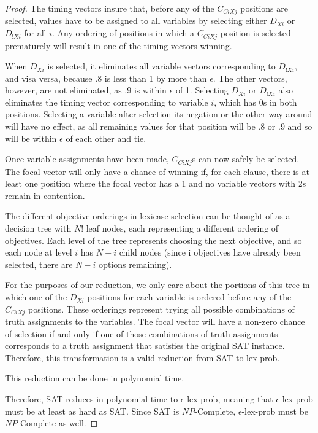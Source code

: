 \documentclass[sigconf]{acmart}
\begin{document}
\begin{proof}
The timing vectors insure that, before any of the $C_{CiXj}$ positions are selected, values have to be assigned to all variables by selecting either $D_{Xi}$ or $D_{!Xi}$ for all $i$. Any ordering of positions in which a $C_{CiXj}$ position is selected prematurely will result in one of the timing vectors winning.

When $D_{Xi}$ is selected, it eliminates all variable vectors corresponding to $D_{!Xi}$, and visa versa, because .8 is less than 1 by more than $\epsilon$. The other vectors, however, are not eliminated, as .9 is within $\epsilon$ of 1. Selecting $D_{Xi}$ or $D_{!Xi}$ also eliminates the timing vector corresponding to variable $i$, which has 0s in both positions. Selecting a variable after selection its negation or the other way around will have no effect, as all remaining values for that position will be .8 or .9 and so will be within $\epsilon$ of each other and tie.

Once variable assignments have been made, $C_{CiXj}$s can now safely be selected. The focal vector will only have a chance of winning if, for each clause, there is at least one position where the focal vector has a 1 and no variable vectors with 2s remain in contention.

The different objective orderings in lexicase selection can be thought of as a decision tree with $N!$ leaf nodes, each representing a different ordering of objectives. Each level of the tree represents choosing the next objective, and so each node at level $i$ has $N-i$ child nodes (since i objectives have already been selected, there are $N-i$ options remaining).

For the purposes of our reduction, we only care about the portions of this tree in which one of the $D_{Xi}$ positions for each variable is ordered before any of the $C_{CiXj}$ positions. These orderings represent trying all possible combinations of truth assignments to the variables. The focal vector will have a non-zero chance of selection if and only if one of those combinations of truth assignments corresponds to a truth assignment that satisfies the original {\sc SAT} instance. Therefore, this transformation is a valid reduction from {\sc SAT} to {\sc lex-prob}.

This reduction can be done in polynomial time. 

Therefore, {\sc SAT} reduces in polynomial time to {\sc $\epsilon$-lex-prob}, meaning that {\sc $\epsilon$-lex-prob} must be at least as hard as {\sc SAT}. Since {\sc SAT} is $NP$-Complete, {\sc $\epsilon$-lex-prob} must be $NP$-Complete as well.


\end{proof}
\end{document}
